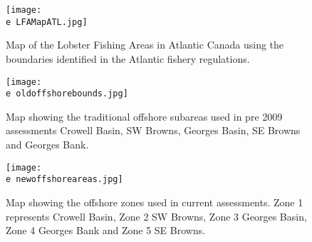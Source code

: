 \documentclass[11pt]{article}
\newcommand{\e}{/backup/bio_data/bio.lobster/figures/} %
\begin{document}
\begin{landscape}
\begin{figure}
\centering
    \texttt{[image: \\e LFAMapATL.jpg]}
    \caption{Map of the Lobster Fishing Areas in Atlantic Canada using the boundaries identified in the Atlantic fishery regulations.}

\end{figure}
\end{landscape}

\begin{figure}
\centering
    \texttt{[image: \\e oldoffshorebounds.jpg]}
    \caption{Map showing the traditional offshore subareas used in pre 2009 assessments Crowell Basin, SW Browns, Georges Basin, SE Browns and Georges Bank.}

\end{figure}

\begin{figure}
\centering
    \texttt{[image: \\e newoffshoreareas.jpg]}
    \caption{Map showing the offshore zones used in current assessments. Zone 1 represents Crowell Basin, Zone 2 SW Browns, Zone 3 Georges Basin, Zone 4 Georges Bank and Zone 5 SE Browns. 
}

\end{figure}
\end{document}
